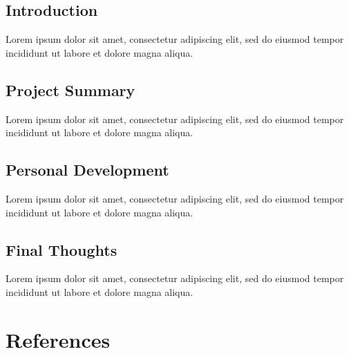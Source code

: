 \documentclass[12pt, a4paper]{article}
\begin{document}

\subsection{Introduction}

Lorem ipsum dolor sit amet, consectetur adipiscing elit, sed do eiusmod tempor incididunt ut labore et dolore magna aliqua.


\subsection{Project Summary}


Lorem ipsum dolor sit amet, consectetur adipiscing elit, sed do eiusmod tempor incididunt ut labore et dolore magna aliqua.


\subsection{Personal Development}

Lorem ipsum dolor sit amet, consectetur adipiscing elit, sed do eiusmod tempor incididunt ut labore et dolore magna aliqua.


\subsection{Final Thoughts}

Lorem ipsum dolor sit amet, consectetur adipiscing elit, sed do eiusmod tempor incididunt ut labore et dolore magna aliqua.

\pagebreak


\section{References}


\end{document}
